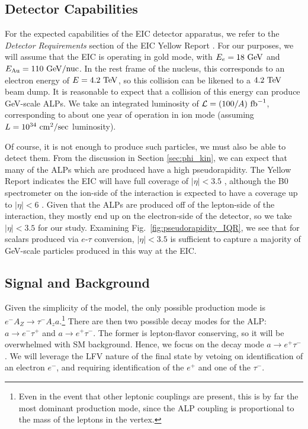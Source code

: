\subsection{Detector Capabilities}\label{sec:EIC_ALP_detector}

For the expected capabilities of the EIC detector apparatus, we refer to the {\it Detector Requirements} section of the EIC Yellow Report \cite{AbdulKhalek:2021gbh}. For our purposes, we will assume that the EIC is operating in gold mode, with $E_e = 18~{\rm GeV}$ and $E_{\rm Au} = 110~{\rm GeV}/{\rm nuc}$. In the rest frame of the nucleus, this corresponds to an electron energy of $E = 4.2~{\rm TeV}$, so this collision can be likened to a $4.2~{\rm TeV}$ beam dump. It is reasonable to expect that a collision of this energy can produce GeV-scale ALPs. We take an integrated luminosity of ${\cal L} = (100/A)~{\rm fb}^{-1}$, corresponding to about one year of operation in ion mode (assuming $L = 10^{34}~{\rm cm}^2/{\rm sec}$ luminosity).

Of course, it is not enough to produce such particles, we must also be able to detect them. From the discussion in  Section \ref{sec:phi_kin}, we can expect that many of the ALPs which are produced have a high pseudorapidity. The Yellow Report indicates the EIC will have full coverage of $|\eta| < 3.5$ \cite{AbdulKhalek:2021gbh}, although the B0 spectrometer on the ion-side of the interaction is expected to have a coverage up to $|\eta| < 6$ \cite{Adkins:2022jfp}. Given that the ALPs are produced off of the lepton-side of the interaction, they mostly end up on the electron-side of the detector, so we take $|\eta| < 3.5$ for our study. Examining Fig.~\ref{fig:pseudorapidity_IQR}, we see that for scalars produced via $e$-$\tau$ conversion, $|\eta| < 3.5$ is sufficient to capture a majority of GeV-scale particles produced in this way at the EIC. 

\subsection{Signal and Background} \label{sec:EIC_ALP_BG}

Given the simplicity of the model, the only possible production mode is $e^- A_Z \rightarrow \tau^- A_z a$.\footnote{Even in the event that other leptonic couplings are present, this is by far the most dominant production mode, since the ALP coupling is proportional to the mass of the leptons in the vertex.} There are then two possible decay modes for the ALP: $a \rightarrow e^- \tau^+$ and $a\rightarrow e^+\tau^-$. The former is lepton-flavor conserving, so it will be overwhelmed with SM background. Hence, we focus on the decay mode $a \rightarrow e^+ \tau^-$. We will leverage the LFV nature of the final state by vetoing on identification of an electron $e^-$, and requiring identification of the $e^+$ and one of the $\tau^-$. 

